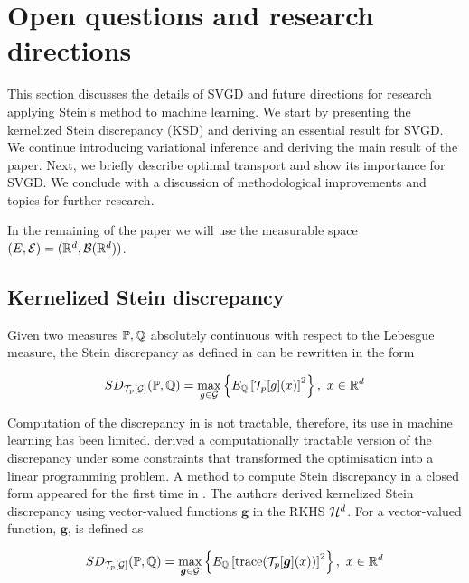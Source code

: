 

\section{Open questions and research directions}\label{rest}
This section discusses the details of SVGD \cite{liu2016stein} and future directions for research applying Stein's method to machine learning. We start by presenting the kernelized Stein discrepancy (KSD) and deriving an essential result for SVGD. We continue introducing variational inference and deriving the main result of the paper. Next, we briefly describe optimal transport and show its importance for SVGD. We conclude with a discussion of methodological improvements and topics for further research.

\noindent In the remaining of the paper we will use the measurable space $(E, \mathcal{E}) = (\mathbb{R}^d, \mathcal{B}(\mathbb{R}^d))$. 

\subsection{Kernelized Stein discrepancy}
Given two measures $\mathbb{P}, \mathbb{Q}$ absolutely continuous with respect to the Lebesgue measure, the Stein discrepancy as defined in  can be rewritten in the form

\begin{equation}\label{stein_discrepancy_2}
SD_{\mathcal{T}_p[\mathcal{G}]}(\mathbb{P}, \mathbb{Q}) = \max_{g \in \mathcal{G}}\left\{E_{\mathbb{Q}}\left[\mathcal{T}_{p}[g](x)\right]^2\right \}, \ x \in \mathbb{R}^d
\end{equation}

Computation of the discrepancy in  is not tractable, therefore, its use in machine learning has been limited. \cite{gorham2015measuring} derived a computationally tractable version of the discrepancy under some constraints that transformed the optimisation into a linear programming problem. A method to compute Stein discrepancy in a closed form appeared for the first time in \cite{liu2016kernelized}. The authors derived kernelized Stein discrepancy using vector-valued functions $\boldsymbol{g}$ in the RKHS $\mathcal{H}^d$. For a vector-valued function, $\boldsymbol{g}$,  is defined as

\begin{equation}\label{stein_discrepancy_vector}
SD_{\mathcal{T}_p[\mathcal{G}]}(\mathbb{P}, \mathbb{Q}) = \max_{\boldsymbol{g} \in \mathcal{G}}\left\{E_{\mathbb{Q}}\left[\text{trace}(\mathcal{T}_{p}[\boldsymbol{g}](x))\right]^2\right \}, \ x \in \mathbb{R}^d
\end{equation}

